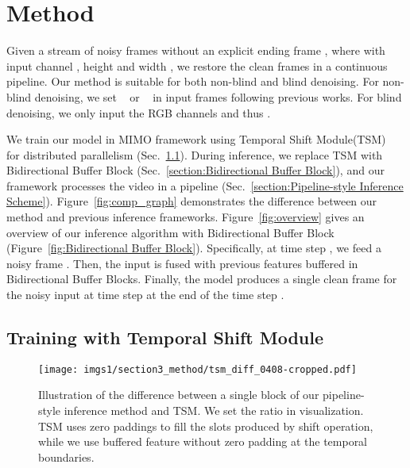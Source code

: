\documentclass[sigconf]{acmart}
\begin{document}
\section{Method}








Given a stream of noisy frames without an explicit ending frame , where  with input channel , height  and width , we restore the clean frames  in a continuous pipeline. 
Our method is suitable for both non-blind and blind denoising. 
For non-blind denoising, we set ~\cite{Vaksman2021Patch,Tassano2020FastDVDNet} or  ~\cite{Maggioni2021Efficient} in input frames following previous works. For blind denoising, we only input the RGB channels and thus .












We train our model in MIMO framework using Temporal Shift Module(TSM)~\cite{Lin2019TSM} for distributed parallelism (Sec.~\ref{section:training_tsm}). During inference, 
we replace TSM with Bidirectional Buffer Block
(Sec.~\ref{section:Bidirectional Buffer Block}), and our framework processes the video in a pipeline (Sec.~\ref{section:Pipeline-style Inference Scheme}).
Figure~\ref{fig:comp_graph} 
demonstrates the difference between our method and previous inference frameworks.
Figure~\ref{fig:overview} gives an overview of our inference algorithm with Bidirectional Buffer Block (Figure~\ref{fig:Bidirectional Buffer Block}).
 Specifically, at time step , we feed a noisy frame . Then, the input is fused with previous features buffered in  Bidirectional Buffer Blocks. Finally, the model produces a single clean frame {} for the noisy input at time step  at the end of the time step .


\subsection{Training with Temporal Shift Module}
\label{section:training_tsm}
\begin{figure}[t]
\center
\texttt{[image: imgs1/section3\_method/tsm\_diff\_0408-cropped.pdf]}
\caption{Illustration of the difference between a single block of our pipeline-style inference method and TSM. We set the ratio  in visualization. TSM uses zero paddings to fill the slots produced by shift operation, while we use buffered feature without zero padding at the temporal boundaries. \vspace{-15pt}}
\label{fig:temporal_shift}
\end{figure}
\end{document}
